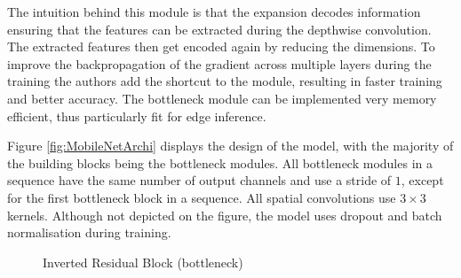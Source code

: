 The intuition behind this module is that the expansion decodes information ensuring that the features can be extracted during the depthwise convolution. The extracted features then get encoded again by reducing the dimensions.
To improve the backpropagation of the gradient across multiple layers during the training the authors add the shortcut to the module, resulting in faster training and better accuracy.
The bottleneck module can be implemented very memory efficient, thus particularly fit for edge inference.

Figure \ref{fig:MobileNetArchi} displays the design of the model, with the majority of the building blocks being the bottleneck modules.
All bottleneck modules in a sequence have the same number of output channels and use a stride of $1$, except for the first bottleneck block in a sequence. All spatial convolutions use $3\times3$ kernels. 
Although not depicted on the figure, the model uses dropout and batch normalisation during training.

\begin{figure}[!htb]
\centering
   \resizebox{.7\linewidth}{!}{}
\caption{Inverted Residual Block (bottleneck)}
\label{fig:bottleneckBlock}
\end{figure}

